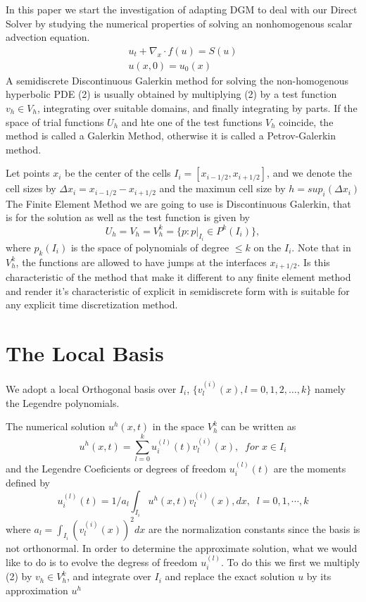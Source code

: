 In this paper we start the investigation of adapting DGM to deal with our Direct Solver by studying the numerical properties of solving an nonhomogenous scalar advection equation.  
\begin{eqnarray}
 u_t + \nabla_x \cdot f(u) = S(u) \\
 u(x,0) = u_0(x) \nonumber
\end{eqnarray}
A semidiscrete Discontinuous Galerkin method for solving the non-homogenous hyperbolic PDE (2) is usually obtained by multiplying (2) by a test function $v_h \in V_h$, integrating over suitable domains, and finally integrating by parts. If the space of trial functions $U_h$ and hte one of the test functions $V_h$ coincide, the method is called a Galerkin Method, otherwise it is called a Petrov-Galerkin method.

Let points $x_i$ be the center of the cells $I_i = [x_{i-1/2},x_{i+1/2}]$, and we denote the cell sizes by $\Delta x_i = x_{i-1/2}-x_{i+1/2}$ and the maximun cell size by $h =  sup_i(\Delta x_i)$ The Finite Element Method we are going to use is Discontinuous Galerkin, that is for the solution as well as the test function is given by
\begin{equation}
 U_h = V_h = V_h^k = \{p : p|_{I_i} \in P^k(I_i)\},
\end{equation}
where $p_k(I_i)$ is the space of polynomials of degree $\leq k$ on the $I_i$. Note that in $V_h^k$, the functions are allowed to have jumps at the interfaces $x_{i+1/2}$. Is this characteristic of the method that make it different to any finite element method and render it's characteristic of explicit in semidiscrete form with is suitable for any explicit time discretization method.


\section{The Local Basis}
We adopt a local Orthogonal basis over $I_i$, $\{v_l^{(i)}(x), l=0,1,2, \dots, k\}$ namely the Legendre polynomials.

The numerical solution $u^h(x,t)$ in the space $V_h^k$ can be written as
\begin{equation}
 u^h(x,t) = \sum_{l=0}^{k} u_i^{(l)}(t)v_l^({i})(x), \; \; for \; x \in I_i
\end{equation}
and the Legendre Coeficients or degrees of freedom $u_i^{(l)}(t)$ are the moments defined by
\begin{equation}
 u_i^{(l)}(t) = 1/a_l \int_{I_i} u^h(x,t)v_l^{(i)}(x),dx, \; \; l = 0,1, \cdots,k
\end{equation}
where $a_l = \int_{I_i} (v_l^{(i)}(x))^2 dx$ are the normalization constants since the basis is not orthonormal. In order to determine the approximate solution, what we would like to do is to evolve the degress of freedom $u_i^{(l)}$. To do this we first we multiply (2) by $v_h \in V_h^k$, and integrate over $I_i$ and replace the exact solution $u$ by its approximation $u^h$


